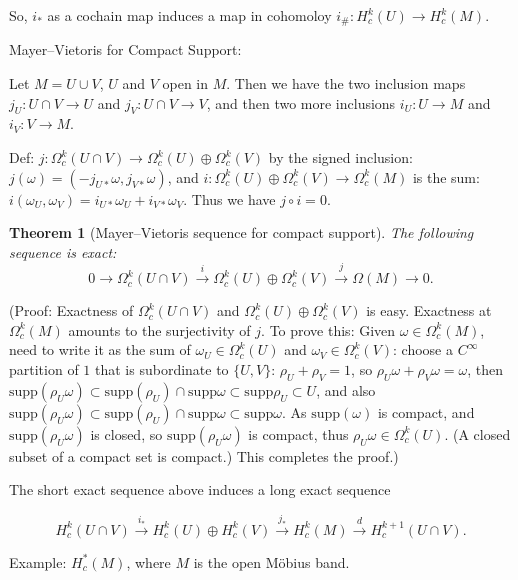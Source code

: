 \documentclass{article}
\theoremstyle{mystyle}
\newtheorem*{theorem*}{Theorem}
\theoremstyle{remark}
\numberwithin{equation}{section}
\begin{document}
So, $i_*$ as a cochain map induces a map in cohomoloy
$i_\#\colon H^k_c(U)\rightarrow H^k_c(M)$.

Mayer--Vietoris for Compact Support:

Let $M = U\cup V$, $U$ and $V$ open in $M$. Then we have the two inclusion maps $j_U\colon U\cap V\rightarrow U$ and $j_V\colon U\cap V\rightarrow V$, and then two more inclusions $i_U\colon U\rightarrow M$ and $i_V\colon V\rightarrow M$. 

Def: $j\colon \Omega^k_c(U\cap V)\rightarrow \Omega^k_c(U)\oplus \Omega^k_c(V)$ by the signed inclusion:
$j(\omega) = ( -j_{U*}\omega, j_{V*}\omega)$, and $i\colon \Omega^k_c(U)\oplus \Omega^k_c(V) \rightarrow \Omega^k_c(M)$ is the sum: $i(\omega_U,\omega_V) = i_{U*}\omega_U + i_{V*}\omega_V$.  Thus we have $j\circ i=0$.

\begin{theorem*}[Mayer--Vietoris sequence for compact support] The following sequence is exact:
\begin{equation}
0\rightarrow \Omega^k_c(U\cap V)\xrightarrow{i}\Omega^k_c(U)\oplus \Omega^k_c(V)\xrightarrow{j}\Omega(M)\rightarrow 0.
\end{equation}
\end{theorem*}

(Proof: Exactness of $\Omega^k_c(U\cap V)$ and $\Omega^k_c(U)\oplus \Omega^k_c(V)$ is easy. Exactness at $\Omega^k_c(M)$ amounts to the surjectivity of $j$. To prove this: Given $\omega \in \Omega^k_c(M)$, need to write it as the sum of $\omega_U\in \Omega^k_c(U)$ and $\omega_V \in \Omega^k_c(V)$: choose a $C^\infty$ partition of $1$ that is subordinate to $\{U,V\}$: $\rho_U+\rho_V=1$, so $\rho_U\omega + \rho_V\omega =\omega$, then $\text{supp}(\rho_U\omega) \subset \text{supp}(\rho_U)\cap \text{supp}\omega \subset \text{supp} \rho_U \subset U$, and also  $\text{supp}(\rho_U\omega) \subset \text{supp}(\rho_U)\cap \text{supp}\omega \subset \text{supp}\omega$. As $\text{supp}(\omega)$ is compact, and $\text{supp}(\rho_U\omega)$ is closed, so $\text{supp}(\rho_U\omega)$ is compact, thus $\rho_U\omega \in \Omega^k_c(U)$. (A closed subset of a compact set is compact.) This completes the proof.)

The short exact sequence above induces a long exact sequence

$$H^k_c(U\cap V)\xrightarrow{i_*} H^k_c(U)\oplus H^k_c(V)\xrightarrow{j_*} H^k_c(M)\xrightarrow{d}
H^{k+1}_c(U\cap V).$$

Example: $H^*_c(M)$, where $M$ is the open Möbius band.
\end{document}
